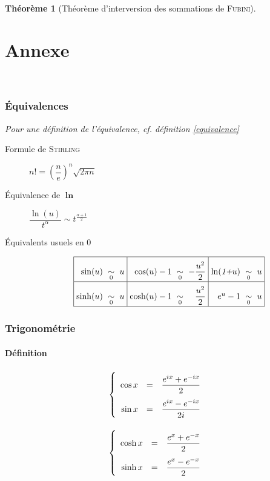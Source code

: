 \documentclass[11pt,a4paper]{report}
\newtheorem{theorem}{Théorème}[chapter]
\theoremstyle{definition}
\begin{document}
\begin{theorem}[Théorème d'interversion des sommations de \textsc{Fubini}]
{{\part{Annexe}
\hfill \\

\section{Équivalences}
Pour une définition de l'équivalence, \textit{cf.} définition \ref{equivalence}
\begin{description}
\item[Formule de \textsc{Stirling}] $\boxed{n!=\left(\dfrac{n}{e}\right)^{n}\sqrt{2\pi n}}$
\item[Équivalence de $\boldsymbol{\ln}$] $\dfrac{\ln(u)}{t^{\alpha}}\sim t^{\frac{\alpha+1}{2}}$
\item[Équivalents usuels en 0] \[
\arraycolsep=3pt\def\arraystretch{2.4}
\begin{array}{|r c l|r c r|r c l|}
\hline
\sin(u)& \underset{0}{\sim}& u & \cos(u)-1 &\underset{0}{\sim} & - \dfrac{u^2}{2} & \ln(\emph{1+}u) &\underset{0}{\sim}& u \\
\hline
\sinh(u) &\underset{0}{\sim} &u & \cosh(u)-1 &\underset{0}{\sim} &\dfrac{u^2}{2} & e^u -1 &\underset{0}{\sim} & u \\
\hline
\end{array}
\]
\end{description}


\section{Trigonométrie}
\subsection{Définition}
\begin{minipage}{0.45\textwidth}
\begin{equation}\label{def:cos}
\left\lbrace
\begin{array}{r c l}
\cos{x}&=&\dfrac{e^{ix}+e^{-ix}}{2}\\
\sin{x}&=&\dfrac{e^{ix}-e^{-ix}}{2i}\\
\end{array}
\right.
\end{equation}
\end{minipage}\hspace{0.1\textwidth}
\begin{minipage}{0.45\textwidth}
\begin{equation}\label{def:cosh}
\left\lbrace
\begin{array}{r c l}
\cosh{x}&=&\dfrac{e^{x}+e^{-x}}{2}\\
\sinh{x}&=&\dfrac{e^{x}-e^{-x}}{2}\\
\end{array}
\right.
\end{equation}
\end{minipage}
%
}}
\end{theorem}
\end{document}
